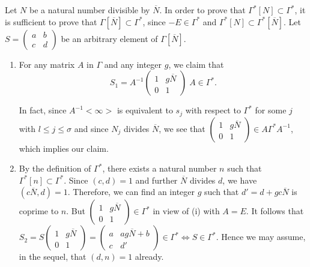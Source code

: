 Let $N$ be a natural number divisible by $\overline{N}$. In order to
prove that $\Gamma^{\ast}[N] \subset \Gamma^{\ast}$, it is sufficient
to prove that $\Gamma[\overline{N}] \subset \Gamma^{\ast}$, since
$-E\in \Gamma^{\ast}$ and $\Gamma^{\ast}[N]\subset
\Gamma^{\ast}[\overline{N}]$. Let $S =
\left(\begin{smallmatrix} a&b\\c&d \end{smallmatrix}\right)$ be an
arbitrary element of $\Gamma[\overline{N}]$.
\begin{enumerate}
\renewcommand{\theenumi}{\roman{enumi}}
\renewcommand{\labelenumi}{\theenumi)}
\item For \pageoriginale any matrix $A$ in $\Gamma$ and any integer
  $g$, we claim that 
$$
S_1 = A^{-1} \left(\begin{smallmatrix} 1&g\overline{N}\\ 0 &
  1 \end{smallmatrix}\right) \; A \in \Gamma^{\ast}.
$$

In fact, since $A^{-1} <\infty>$ is equivalent to $s_j$ with respect
to $\Gamma^{\ast}$ for some $j$ with $l\leq j \leq \sigma$ and since
$N_j$ divides $\overline{N}$, we see that
$\left(\begin{smallmatrix} 1 & g
  \overline{N}\\0&1 \end{smallmatrix}\right)\in A\Gamma^{\ast}
A^{-1}$, which implies our claim.

\item By the definition of $\Gamma^{\ast}$, there exists a natural
  number $n$ such that $\Gamma^{\ast}[n] \subset \Gamma^{\ast}$. Since
  $(c,d)=1$ and further $\overline{N}$ divides $d$, we have $(c
  \overline{N},d)=1$. Therefore, we can find an integer $g$ such that
  $d'=d+gc\overline{N}$ is coprime to $n$. But
  $\left(\begin{smallmatrix} 1 &g\overline{N}\\0 &
    1 \end{smallmatrix}\right) \in \Gamma^{\ast}$ in view of
  (i) with $A=E$. It follows that $S_2=S
  \left(\begin{smallmatrix}1&g\overline{N}\\ 0 &
    1\end{smallmatrix}\right)=
    \left(\begin{smallmatrix} a &
      ag\overline{N}+b\\c&d' \end{smallmatrix}\right)
    \in\Gamma^{\ast} \Longleftrightarrow S \in
    \Gamma^{\ast}$. Hence we may assume, in the sequel, that $(d,n)=1$ already.
 

\end{enumerate}
